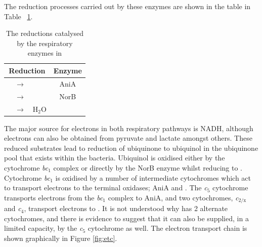 The reduction processes carried out by these enzymes are shown in the table in Table ~{\ref{tab:reduction-enzymes}}.

\begin{table}[tbp]
\begin{center}
\begin{tabular}{lclc}
\toprule
\multicolumn{3}{c}{\textbf{Reduction}}& \textbf{Enzyme} \\
\midrule
\cNitrite{} & $\rightarrow$ & \cNO{} & AniA \\
\cNO{} & $\rightarrow$ & \cNtwoO{} & NorB \\
\cOxygen{} & $\rightarrow$ & H$_{\textrm{2}}$O & \cbbthree{} \\
\bottomrule
\end{tabular} 
\end{center}
\caption{The reductions catalysed by the respiratory enzymes in \Nm{}
\label{tab:reduction-enzymes}}
\end{table}

The major source for electrons in both respiratory pathways is NADH, although electrons can also be obtained from pyruvate and lactate amongst others. These reduced substrates lead to reduction of ubiquinone to ubiquinol in the ubiquinone pool that exists within the bacteria. Ubiquinol is oxidised either by the cytochrome \textit{bc$_{\textrm{1}}$} complex or directly by the NorB enzyme whilst reducing \cNO{} to \cNtwoO{}. Cytochrome \textit{bc$_{\textrm{1}}$} is oxidised by a number of intermediate cytochromes which act to transport electrons to the terminal oxidases; AniA and \cbbthree{}. The \textit{c$_{\textrm{5}}$} cytochrome transports electrons from the \textit{bc$_{\textrm{1}}$} complex to AniA, and two cytochromes, \textit{c$_{\textrm{2/x}}$} and \textit{c$_{\textrm{4}}$}, transport electrons to \cbbthree{}. It is not understood why \cbbthree{} has 2 alternate cytochromes, and there is evidence to suggest that it can also be supplied, in a limited capacity, by the \textit{c$_{\textrm{5}}$} cytochrome as well\cite{Deeudom2008}. The electron transport chain is shown graphically in Figure \ref{fig:etc}.

